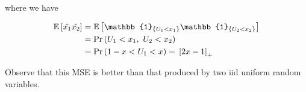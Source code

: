 \documentclass[twoside]{article}
\begin{document}
where we have

\begin{align}
    \mean{\hat{x_1}\hat{x_2}} &= \mean{\mathbb{1}_{\cbrak{U_1 < x_1}}\mathbb{1}_{\cbrak{U_2 < x_2}}} \\
                              &= \pr{U_1 < x_1,\ U_2 < x_2} \\
                              &= \pr{1 - x < U_1 < x} = \sbrak{2x-1}_{+}
                              \label{eq:mean-prod}
\end{align}

Observe that this MSE is better than that produced by two iid uniform random variables.
\end{document}
